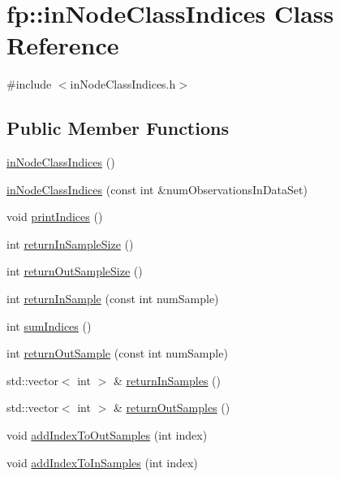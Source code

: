 \hypertarget{classfp_1_1inNodeClassIndices}{}\section{fp\+:\+:in\+Node\+Class\+Indices Class Reference}
\label{classfp_1_1inNodeClassIndices}


{\ttfamily \#include $<$in\+Node\+Class\+Indices.\+h$>$}

\subsection*{Public Member Functions}
\begin{DoxyCompactItemize}
\item 
\hyperlink{classfp_1_1inNodeClassIndices_acc461b0620f39dfc6336313993c808fb}{in\+Node\+Class\+Indices} ()
\item 
\hyperlink{classfp_1_1inNodeClassIndices_a2b73531fc84c16ad3789af7307fb8688}{in\+Node\+Class\+Indices} (const int \&num\+Observations\+In\+Data\+Set)
\item 
void \hyperlink{classfp_1_1inNodeClassIndices_a152ae5e3f46bad404f5e126db9d4f816}{print\+Indices} ()
\item 
int \hyperlink{classfp_1_1inNodeClassIndices_a1a5f1c59beb9e9e92fa7c6ea648e9cfa}{return\+In\+Sample\+Size} ()
\item 
int \hyperlink{classfp_1_1inNodeClassIndices_ab7c873166d2be3b13d0f81d0fed2c57f}{return\+Out\+Sample\+Size} ()
\item 
int \hyperlink{classfp_1_1inNodeClassIndices_a8a6d33c7a2c2d24d8cf53493aded4541}{return\+In\+Sample} (const int num\+Sample)
\item 
int \hyperlink{classfp_1_1inNodeClassIndices_a19c5ff722a6fc3e1c7b8bddd6ecdb640}{sum\+Indices} ()
\item 
int \hyperlink{classfp_1_1inNodeClassIndices_acb8799a2eb8c48a8f74a7aaff244028e}{return\+Out\+Sample} (const int num\+Sample)
\item 
std\+::vector$<$ int $>$ \& \hyperlink{classfp_1_1inNodeClassIndices_a129b49f3d1b1346f60f393799741ada0}{return\+In\+Samples} ()
\item 
std\+::vector$<$ int $>$ \& \hyperlink{classfp_1_1inNodeClassIndices_ab360c9f6184c55a48550982aaf4b5e4a}{return\+Out\+Samples} ()
\item 
void \hyperlink{classfp_1_1inNodeClassIndices_afba0621732ce2df66125dfa0dbd2f3f7}{add\+Index\+To\+Out\+Samples} (int index)
\item 
void \hyperlink{classfp_1_1inNodeClassIndices_a37be5b697482b59dcba2ed4123464877}{add\+Index\+To\+In\+Samples} (int index)
\end{DoxyCompactItemize}

